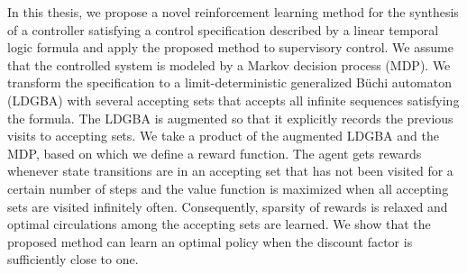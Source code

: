 In this thesis, we propose a novel reinforcement learning method for the synthesis of a controller satisfying a control specification described by a linear temporal logic formula and apply the proposed method to supervisory control. We assume that the controlled system is modeled by a Markov decision process (MDP).
We transform the specification to a limit-deterministic generalized B\"{u}chi automaton (LDGBA) with several accepting sets that accepts all infinite sequences satisfying the formula.
The LDGBA is augmented so that it explicitly records the previous visits to accepting sets.
We take a product of the augmented LDGBA and the MDP, based on which we define a reward function. The agent gets rewards whenever state transitions are in an accepting set that has not been visited for a certain number of steps and the value function is maximized when all accepting sets are visited infinitely often.
Consequently, sparsity of rewards is relaxed and optimal circulations among the accepting sets are learned. We show that the proposed method can learn an optimal policy when the discount factor is sufficiently close to one.
